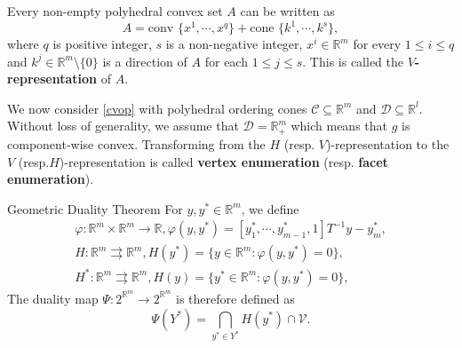 \documentclass[10pt,xcolor={table,dvipsnames},t,unknownkeysallowed]{beamer}
\newcommand{\R}{\mathbb{R}}
\newcommand{\cone}[1]{\mathcal{#1}}
\begin{document}
\begin{frame}{}
    \begin{remark}
        Every non-empty polyhedral convex set $A$ can be written as
        \begin{equation}\label{v-rep}
            A = \text{conv }\{x^1,\cdots,x^q\} + \text{cone }\{k^1,\cdots,k^s\},
        \end{equation}
        where $q$ is positive integer, $s$ is a non-negative integer, $x^i\in\R^m$ for every $1\leq i\leq q$ and $k^j\in\R^m\setminus\{0\}$ is a direction of $A$ for each $1\leq j\leq s$. This is called the \textbf{\alert{$V$-representation}} of $A$. 
    \end{remark}
    We now consider \eqref{cvop} with polyhedral ordering cones $\cone{C}\subseteq\R^m$ and $\cone{D}\subseteq\R^l$. Without loss of generality, we assume that $\cone{D}=\R^m_+$ which means that $g$ is component-wise convex.
    \newline
    Transforming from the $H$ (resp. $V$)-representation to the $V$ (resp.$H$)-representation is called \textbf{\alert{vertex enumeration}} (resp. \textbf{\alert{facet enumeration}}).
    
\end{frame}
\begin{frame}{Geometric Duality Theorem}
For $y, y^*\in \R^m$, we define
\[
\begin{array}{l}
     \varphi: \R^m\times\R^m\to\R, \varphi(y,y^*)=[y^*_1,\cdots,y^*_{m-1},1]T^{-1}y - y^*_m,  \\
      H: \R^m\rightrightarrows \R^m, H(y^*) = \{y\in\R^m: \varphi(y,y^*)=0\},\\
      H^*: \R^m\rightrightarrows \R^m, H(y) = \{y^*\in\R^m: \varphi(y,y^*)=0\},
\end{array}
\]
The duality map $\Psi: 2^{\R^m}\to  2^{\R^m}$ is therefore defined as
\[
\Psi(Y^*) = \bigcap_{y^*\in Y^*} H(y^*) \cap \cone{V}.
\]
    
\end{frame}
\end{document}

